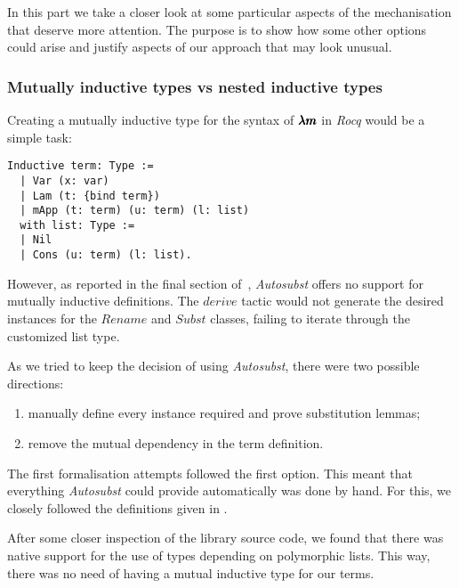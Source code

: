 In this part we take a closer look at some particular aspects of the mechanisation that deserve more attention.
The purpose is to show how some other options could arise and justify aspects of our approach that may look unusual.

\subsubsection{Mutually inductive types vs nested inductive types}

Creating a mutually inductive type for the syntax of $\pmb{\lambda m}$ in \textit{Rocq} would be a simple task:
\begin{lstlisting}[language=Coq]
  Inductive term: Type :=
  | Var (x: var)
  | Lam (t: {bind term})
  | mApp (t: term) (u: term) (l: list)
  with list: Type :=
  | Nil
  | Cons (u: term) (l: list). 
\end{lstlisting}

However, as reported in the final section of~\cite{AutosubstSchafer}, \textit{Autosubst} offers no support for mutually inductive definitions.
The \lst$derive$ tactic would not generate the desired instances for the \lst$Rename$ and \lst$Subst$ classes, failing to iterate through the customized list type.

As we tried to keep the decision of using \textit{Autosubst}, there were two possible directions:
\begin{enumerate}
\item manually define every instance required and prove substitution lemmas;
\item remove the mutual dependency in the term definition.
\end{enumerate}

The first formalisation attempts followed the first option.
This meant that everything \textit{Autosubst} could provide automatically was done by hand.
For this, we closely followed the definitions given in \cite{AutosubstSchafer}.


After some closer inspection of the library source code, we found that there was native support for the use of types depending on polymorphic lists.
This way, there was no need of having a mutual inductive type for our terms.

